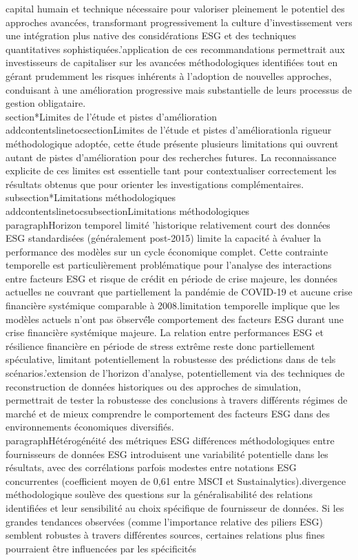 capital humain et technique nécessaire pour valoriser pleinement le potentiel des approches avancées, transformant progressivement la culture d'investissement vers une intégration plus native des considérations ESG et des techniques quantitatives sophistiquées.\n\nL'application de ces recommandations permettrait aux investisseurs de capitaliser sur les avancées méthodologiques identifiées tout en gérant prudemment les risques inhérents à l'adoption de nouvelles approches, conduisant à une amélioration progressive mais substantielle de leurs processus de gestion obligataire.\n\n\\section*{Limites de l'étude et pistes d'amélioration}\n\\addcontentsline{toc}{section}{Limites de l'étude et pistes d'amélioration}\n{} la rigueur méthodologique adoptée, cette étude présente plusieurs limitations qui ouvrent autant de pistes d'amélioration pour des recherches futures. La reconnaissance explicite de ces limites est essentielle tant pour contextualiser correctement les résultats obtenus que pour orienter les investigations complémentaires.\n\n\\subsection*{Limitations méthodologiques}\n\\addcontentsline{toc}{subsection}{Limitations méthodologiques}\n\n\\paragraph{Horizon temporel limité} \nL'historique relativement court des données ESG standardisées (généralement post-2015) limite la capacité à évaluer la performance des modèles sur un cycle économique complet. Cette contrainte temporelle est particulièrement problématique pour l'analyse des interactions entre facteurs ESG et risque de crédit en période de crise majeure, les données actuelles ne couvrant que partiellement la pandémie de COVID-19 et aucune crise financière systémique comparable à 2008.\n\nCette limitation temporelle implique que les modèles actuels n'ont pas \"observé\" le comportement des facteurs ESG durant une crise financière systémique majeure. La relation entre performances ESG et résilience financière en période de stress extrême reste donc partiellement spéculative, limitant potentiellement la robustesse des prédictions dans de tels scénarios.\n\nL'extension de l'horizon d'analyse, potentiellement via des techniques de reconstruction de données historiques ou des approches de simulation, permettrait de tester la robustesse des conclusions à travers différents régimes de marché et de mieux comprendre le comportement des facteurs ESG dans des environnements économiques diversifiés.\n\n\\paragraph{Hétérogénéité des métriques ESG} \nLes différences méthodologiques entre fournisseurs de données ESG introduisent une variabilité potentielle dans les résultats, avec des corrélations parfois modestes entre notations ESG concurrentes (coefficient moyen de 0,61 entre MSCI et Sustainalytics).\n\nCette divergence méthodologique soulève des questions sur la généralisabilité des relations identifiées et leur sensibilité au choix spécifique de fournisseur de données. Si les grandes tendances observées (comme l'importance relative des piliers ESG) semblent robustes à travers différentes sources, certaines relations plus fines pourraient être influencées par les spécificités 